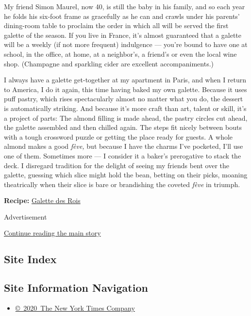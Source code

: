 My friend Simon Maurel, now 40, is still the baby in his family, and so
each year he folds his six-foot frame as gracefully as he can and crawls
under his parents' dining-room table to proclaim the order in which all
will be served the first galette of the season. If you live in France,
it's almost guaranteed that a galette will be a weekly (if not more
frequent) indulgence --- you're bound to have one at school, in the
office, at home, at a neighbor's, a friend's or even the local wine
shop. (Champagne and sparkling cider are excellent accompaniments.)

I always have a galette get-together at my apartment in Paris, and when
I return to America, I do it again, this time having baked my own
galette. Because it uses puff pastry, which rises spectacularly almost
no matter what you do, the dessert is automatically striking. And
because it's more craft than art, talent or skill, it's a project of
parts: The almond filling is made ahead, the pastry circles cut ahead,
the galette assembled and then chilled again. The steps fit nicely
between bouts with a tough crossword puzzle or getting the place ready
for guests. A whole almond makes a good \emph{fève,} but because I have
the charms I've pocketed, I'll use one of them. Sometimes more --- I
consider it a baker's prerogative to stack the deck. I disregard
tradition for the delight of seeing my friends bent over the galette,
guessing which slice might hold the bean, betting on their picks,
moaning theatrically when their slice is bare or brandishing the coveted
\emph{fève} in triumph.

\textbf{Recipe:}
\href{https://cooking.nytimes3xbfgragh.onion/recipes/1019114-galette-des-rois}{Galette
des Rois}

Advertisement

\protect\hyperlink{after-bottom}{Continue reading the main story}

\hypertarget{site-index}{%
\subsection{Site Index}\label{site-index}}

\hypertarget{site-information-navigation}{%
\subsection{Site Information
Navigation}\label{site-information-navigation}}

\begin{itemize}
\tightlist
\item
  \href{https://help.nytimes3xbfgragh.onion/hc/en-us/articles/115014792127-Copyright-notice}{©~2020~The
  New York Times Company}
\end{itemize}

